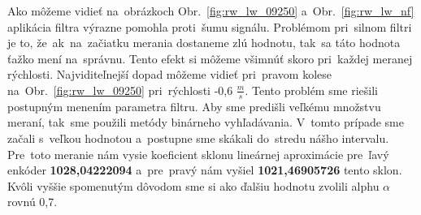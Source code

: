 Ako môžeme vidieť na~obrázkoch Obr.~\ref{fig:rw_lw_09250} a~Obr.~\ref{fig:rw_lw_nf} aplikácia filtra výrazne pomohla proti~šumu signálu.
Problémom pri~silnom filtri je to, že~ak~na~začiatku merania dostaneme zlú hodnotu, tak~sa táto hodnota ťažko mení na~správnu. Tento
efekt si môžeme všimnúť skoro pri~každej meranej rýchlosti. Najviditeľnejší dopad môžeme vidieť pri~pravom kolese
na~Obr.~\ref{fig:rw_lw_09250} pri~rýchlosti -0,6 $\frac{m}{s}$. Tento problém sme riešili postupným menením parametra filtru.
Aby sme predišli veľkému množstvu meraní, tak~sme použili metódy binárneho vyhľadávania. V~tomto prípade sme začali s~veľkou hodnotou
a~postupne sme skákali do~stredu nášho intervalu. Pre~toto meranie nám vysie koeficient sklonu lineárnej aproximácie
pre~ľavý enkóder \textbf{1028,04222094} a~pre~pravý nám vyšiel \textbf{1021,46905726} tento sklon. Kvôli vyššie spomenutým
dôvodom sme si ako ďalšiu hodnotu zvolili alphu $\alpha$ rovnú 0,7.

